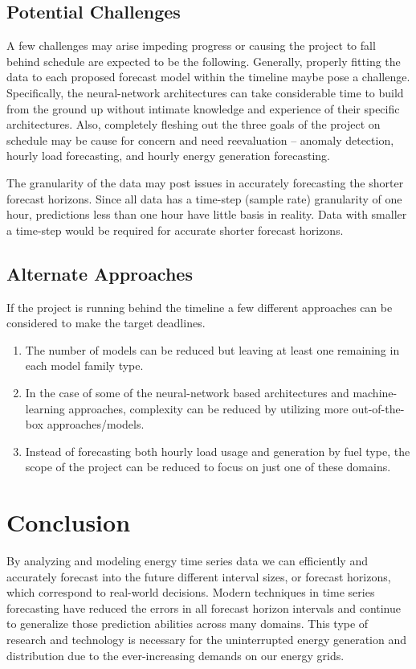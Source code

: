 \documentclass[sigconf]{acmart}
\begin{document}
\subsection{Potential Challenges}
A few challenges may arise impeding progress or causing the project to fall behind schedule are expected to be the following. 
Generally, properly fitting the data to each proposed forecast model within the timeline maybe pose a challenge. Specifically, the neural-network architectures can take considerable time to build from the ground up without intimate knowledge and experience of their specific architectures. Also, completely fleshing out the three goals of the project on schedule may be cause for concern and need reevaluation -- anomaly detection, hourly load forecasting, and hourly energy generation forecasting.

The granularity of the data may post issues in accurately forecasting the shorter forecast horizons. Since all data has a time-step (sample rate) granularity of one hour, predictions less than one hour have little basis in reality. Data with smaller a time-step would be required for accurate shorter forecast horizons.

\subsection{Alternate Approaches}
If the project is running behind the timeline a few different approaches can be considered to make the target deadlines. 

\begin{enumerate}
  \item The number of models can be reduced but leaving at least one remaining in each model family type. 
  \item In the case of some of the neural-network based architectures and machine-learning approaches, complexity can be reduced by utilizing more out-of-the-box approaches/models. 
  \item Instead of forecasting both hourly load usage and generation by fuel type, the scope of the project can be reduced to focus on just one of these domains.
\end{enumerate}

\section{Conclusion}
By analyzing and modeling energy time series data we can efficiently and accurately forecast into the future different interval sizes, or forecast horizons, which correspond to real-world decisions. Modern techniques in time series forecasting have reduced the errors in all forecast horizon intervals and continue to generalize those prediction abilities across many domains. This type of research and technology is necessary for the uninterrupted energy generation and distribution due to the ever-increasing demands on our energy grids.
\end{document}
